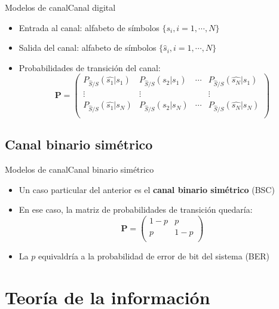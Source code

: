 \documentclass[10pt,compress]{beamer} %
\begin{document}
\begin{frame}{Modelos de canal}{Canal digital}
  \begin{itemize}
    \item Entrada al canal: alfabeto de símbolos $\{s_i, i=1,\cdots ,N\}$
    \item Salida del canal: alfabeto de símbolos $\{\hat{s}_i, i=1,\cdots ,N\}$
    \item Probabilidades de transición del canal:
    \begin{displaymath}
      \mathbf{P} = \left ( \begin{array}{cccc} P_{\hat{S}/S}(\hat{s_1}|s_1) & P_{\hat{S}/S}(\hat{s_2}|s_1) & \cdots &  P_{\hat{S}/S}(\hat{s_N}|s_1) \\ 
        \vdots & \vdots &  & \vdots \\
        P_{\hat{S}/S}(\hat{s_1}|s_N) & P_{\hat{S}/S}(\hat{s_2}|s_N) & \cdots &  P_{\hat{S}/S}(\hat{s_N}|s_N) \\ \end{array} \right )
    \end{displaymath}
  \end{itemize}
\end{frame}

\subsection{Canal binario simétrico}
\begin{frame}{Modelos de canal}{Canal binario simétrico}
  \begin{itemize}
    \item Un caso particular del anterior es el {\bf canal binario simétrico} (BSC)
    \item En ese caso, la matriz de probabilidades de transición quedaría:
    \begin{displaymath}
      \mathbf{P} = \left ( \begin{array}{cc} 1-p & p \\ p & 1-p \\ \end{array} \right )
    \end{displaymath}
    \item La $p$ equivaldría a la probabilidad de error de bit del sistema (BER)
  \end{itemize}
\end{frame}


\section{Teoría de la información}
\end{document}
